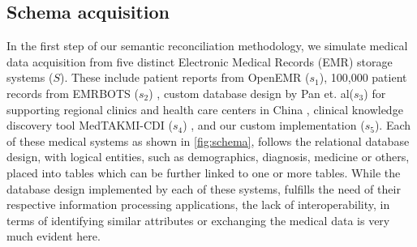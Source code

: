 \documentclass{ieeeaccess}
\begin{document}
\subsection{Schema acquisition}
\label{schema_acq}
In the first step of our semantic reconciliation methodology, we simulate medical data acquisition from five distinct Electronic Medical Records (EMR) storage systems ($S$). These include patient reports from OpenEMR ($s_1$), 100,000 patient records from EMRBOTS ($s_2$) \cite{kartoun2016methodology}, custom database design by Pan et. al($s_3$) for supporting regional clinics and health care centers in China \cite{pan2016design}, clinical knowledge discovery tool MedTAKMI-CDI ($s_4$) \cite{inokuchi2007medtakmi}, and our custom implementation ($s_5$). Each of these medical systems as shown in \ref{fig:schema}, follows the relational database design, with logical entities, such as demographics, diagnosis, medicine or others, placed into tables which can be further linked to one or more tables. While the database design implemented by each of these systems, fulfills the need of their respective information processing applications, the lack of interoperability, in terms of identifying similar attributes or exchanging the medical data is very much evident here. 
\end{document}
